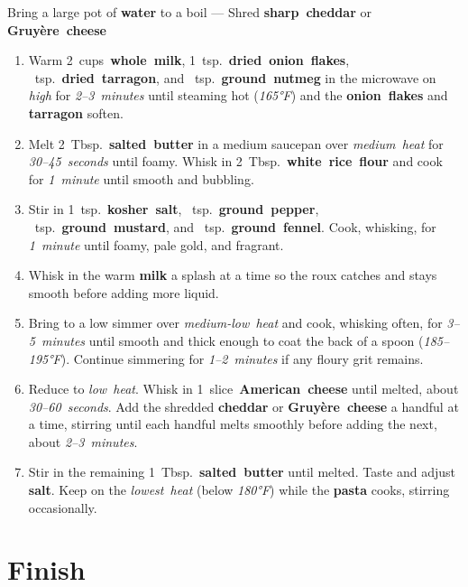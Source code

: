 \documentclass[11pt,letterpaper]{article}
\begin{document}
\noindent
Bring a large pot of \textbf{water} to a boil ---
Shred \textbf{sharp~cheddar} or \textbf{Gruyère~cheese}

\begin{enumerate}
    \item Warm 2~cups~\textbf{whole~milk}, 1~tsp.~\textbf{dried~onion~flakes}, ~tsp.~\textbf{dried~tarragon}, and ~tsp.~\textbf{ground~nutmeg} in the microwave on \textit{high} for \textit{2--3~minutes} until steaming hot (\textit{165°F}) and the \textbf{onion~flakes} and \textbf{tarragon} soften.

    \item Melt 2~Tbsp.~\textbf{salted~butter} in a medium saucepan over \textit{medium~heat} for \textit{30--45~seconds} until foamy. Whisk in 2~Tbsp.~\textbf{white~rice~flour} and cook for \textit{1~minute} until smooth and bubbling.

    \item Stir in 1~tsp.~\textbf{kosher~salt}, ~tsp.~\textbf{ground~pepper}, ~tsp.~\textbf{ground~mustard}, and ~tsp.~\textbf{ground~fennel}. Cook, whisking, for \textit{1~minute} until foamy, pale gold, and fragrant.

    \item Whisk in the warm \textbf{milk} a splash at a time so the roux catches and stays smooth before adding more liquid.

    \item Bring to a low simmer over \textit{medium-low~heat} and cook, whisking often, for \textit{3--5~minutes} until smooth and thick enough to coat the back of a spoon (\textit{185--195°F}). Continue simmering for \textit{1--2~minutes} if any floury grit remains.

    \item Reduce to \textit{low~heat}. Whisk in 1~slice~\textbf{American~cheese} until melted, about \textit{30--60~seconds}. Add the shredded \textbf{cheddar} or \textbf{Gruyère~cheese} a handful at a time, stirring until each handful melts smoothly before adding the next, about \textit{2--3~minutes}.

    \item Stir in the remaining 1~Tbsp.~\textbf{salted~butter} until melted. Taste and adjust \textbf{salt}. Keep on the \textit{lowest~heat} (below \textit{180°F}) while the \textbf{pasta} cooks, stirring occasionally.
\end{enumerate}

\section*{Finish}
\end{document}

